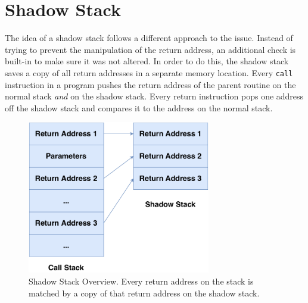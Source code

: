 \documentclass[10pt,twocolumn,a4paper]{article}
\begin{document}
\section{Shadow Stack}\label{shadowstack}
The idea of a shadow stack follows a different approach to the issue.
Instead of trying to prevent the manipulation of the return address, an additional check is built-in to make sure it was not altered.
In order to do this, the shadow stack saves a copy of all return addresses in a separate memory location\cite{shan}.
Every \texttt{call} instruction in a program pushes the return address of the parent routine on the normal stack \emph{and} on the shadow stack.
Every return instruction pops one address off the shadow stack and compares it to the address on the normal stack\cite{shan}.
\begin{figure}[h]
\includegraphics[keepaspectratio,width=8cm]{fig/ShadowStack}
\caption{Shadow Stack Overview. Every return address on the stack is matched by a copy of that return address on the shadow stack.}
\end{figure}
\end{document}
